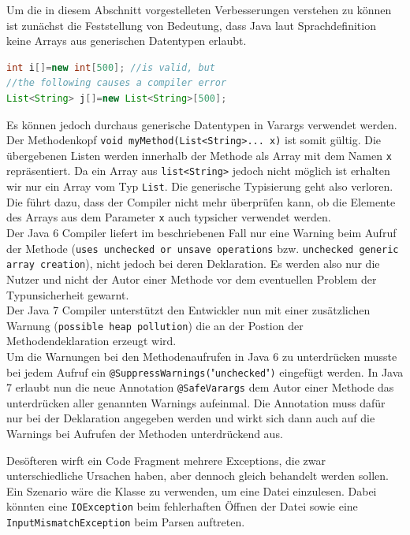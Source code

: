 \documentclass[times, 10pt,twocolumn]{article}
\begin{document}
Um die in diesem Abschnitt vorgestelleten Verbesserungen verstehen zu können ist zunächst die Feststellung von Bedeutung, dass Java laut Sprachdefinition keine Arrays aus generischen Datentypen erlaubt.
\begin{lstlisting}[language=java,breaklines=true]
int i[]=new int[500]; //is valid, but
//the following causes a compiler error
List<String> j[]=new List<String>[500];
\end{lstlisting}
Es können jedoch durchaus generische Datentypen in Varargs verwendet werden. Der Methodenkopf \texttt{void myMethod(List<String>... x)} ist somit gültig. Die übergebenen Listen werden innerhalb der Methode als Array mit dem Namen \texttt{x} repräsentiert. Da ein Array aus \texttt{list<String>} jedoch nicht möglich ist erhalten wir nur ein Array vom Typ \texttt{List}. Die generische Typisierung geht also verloren.\\

Die führt dazu, dass der Compiler nicht mehr überprüfen kann, ob die Elemente des Arrays aus dem Parameter \texttt{x} auch typsicher verwendet werden.\cite{v2bJava7}\\

Der Java 6 Compiler liefert im beschriebenen Fall nur eine Warning beim Aufruf der Methode (\texttt{uses unchecked or unsave operations} bzw. \texttt{unchecked generic array creation}), nicht jedoch bei deren Deklaration. Es werden also nur die Nutzer und nicht der Autor einer Methode vor dem eventuellen Problem der Typunsicherheit gewarnt.\\

Der Java 7 Compiler unterstützt den Entwickler nun mit einer zusätzlichen Warnung (\texttt{possible heap pollution}) die an der Postion der Methodendeklaration erzeugt wird.\\

Um die Warnungen bei den Methodenaufrufen in Java 6 zu unterdrücken musste bei jedem Aufruf ein 
\texttt{@SuppressWarnings(}"\texttt{unchecked}"\texttt{)} eingefügt werden. In Java 7 erlaubt nun die neue Annotation \texttt{@SafeVarargs} dem Autor einer Methode das unterdrücken aller genannten Warnings aufeinmal. Die Annotation muss dafür nur bei der Deklaration angegeben werden und wirkt sich dann auch auf die Warnings bei Aufrufen der Methoden unterdrückend aus.

Desöfteren wirft ein Code Fragment mehrere Exceptions, die zwar unterschiedliche Ursachen haben, aber dennoch gleich behandelt
werden sollen. Ein Szenario wäre die Klasse  zu verwenden, um eine Datei einzulesen. Dabei könnten eine 
\texttt{IOException} beim fehlerhaften Öffnen der Datei sowie eine \texttt{InputMismatchException} beim Parsen auftreten.
\end{document}
